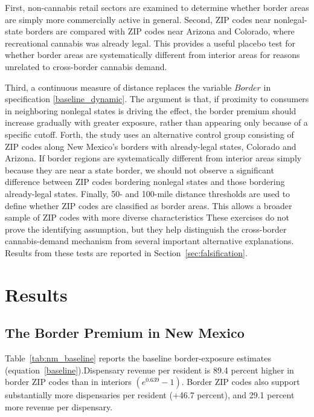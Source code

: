 \documentclass[12pt]{article}
\begin{document}
First, non-cannabis retail sectors are examined to determine whether border areas are simply more commercially active in general. Second, ZIP codes near nonlegal-state borders are compared with ZIP codes near Arizona and Colorado, where recreational cannabis was already legal. This provides a useful placebo test for whether border areas are systematically different from interior areas for reasons unrelated to cross-border cannabis demand.

 Third, a continuous measure of distance replaces the variable $Border$ in specification \ref{baseline_dynamic}. The argument is that, if proximity to consumers in neighboring nonlegal states is driving the effect, the border premium should increase gradually with greater exposure, rather than appearing only because of a specific cutoff. Forth, the study uses an alternative control group consisting of ZIP codes along New Mexico’s borders with already-legal states, Colorado and Arizona. If border regions are systematically different from interior areas simply because they are near a state border, we should not observe a significant difference between ZIP codes bordering nonlegal states and those bordering already-legal states.
 Finally, 50- and 100-mile distance thresholds are used to define whether ZIP codes are classified as border areas. This allows a broader sample of ZIP codes with more diverse characteristics These exercises do not prove the identifying assumption, but they help distinguish the cross-border cannabis-demand mechanism from several important alternative explanations. Results from these tests are reported in Section~\ref{sec:falsification}.

\section{Results}
\label{sec:result1}


\subsection{The Border Premium in New Mexico}

Table~\ref{tab:nm_baseline} reports the baseline border-exposure estimates (equation~\ref{baseline}).Dispensary revenue per resident is 89.4 percent higher in border ZIP codes than in interiors \(\left(e^{0.639}-1\right)\).
Border ZIP codes also support substantially more dispensaries per resident (+46.7 percent), and 29.1 percent more revenue per
dispensary. 
\end{document}
